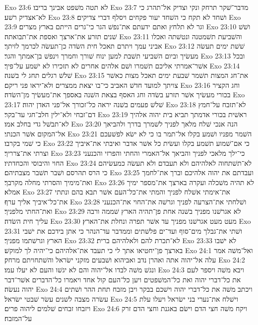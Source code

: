 Exo 23:6  לא תטה משׁפט אבינך בריבו׃
Exo 23:7  מדבר־שׁקר תרחק ונקי וצדיק אל־תהרג כי לא־אצדיק רשׁע׃
Exo 23:8  ושׁחד לא תקח כי השׁחד יעור פקחים ויסלף דברי צדיקים׃
Exo 23:9  וגר לא תלחץ ואתם ידעתם את־נפשׁ הגר כי־גרים הייתם בארץ מצרים׃
Exo 23:10  ושׁשׁ שׁנים תזרע את־ארצך ואספת את־תבואתה׃
Exo 23:11  והשׁביעת תשׁמטנה ונטשׁתה ואכלו אביני עמך ויתרם תאכל חית השׂדה כן־תעשׂה לכרמך לזיתך׃
Exo 23:12  שׁשׁת ימים תעשׂה מעשׂיך וביום השׁביעי תשׁבת למען ינוח שׁורך וחמרך וינפשׁ בן־אמתך והגר׃
Exo 23:13  ובכל אשׁר־אמרתי אליכם תשׁמרו ושׁם אלהים אחרים לא תזכירו לא ישׁמע על־פיך׃
Exo 23:14  שׁלשׁ רגלים תחג לי בשׁנה׃
Exo 23:15  את־חג המצות תשׁמר שׁבעת ימים תאכל מצות כאשׁר צויתך למועד חדשׁ האביב כי־בו יצאת ממצרים ולא־יראו פני ריקם׃
Exo 23:16  וחג הקציר בכורי מעשׂיך אשׁר תזרע בשׂדה וחג האסף בצאת השׁנה באספך את־מעשׂיך מן־השׂדה׃
Exo 23:17  שׁלשׁ פעמים בשׁנה יראה כל־זכורך אל־פני האדן יהוה׃
Exo 23:18  לא־תזבח על־חמץ דם־זבחי ולא־ילין חלב־חגי עד־בקר׃
Exo 23:19  ראשׁית בכורי אדמתך תביא בית יהוה אלהיך לא־תבשׁל גדי בחלב אמו׃
Exo 23:20  הנה אנכי שׁלח מלאך לפניך לשׁמרך בדרך ולהביאך אל־המקום אשׁר הכנתי׃
Exo 23:21  השׁמר מפניו ושׁמע בקלו אל־תמר בו כי לא ישׂא לפשׁעכם כי שׁמי בקרבו׃
Exo 23:22  כי אם־שׁמוע תשׁמע בקלו ועשׂית כל אשׁר אדבר ואיבתי את־איביך וצרתי את־צרריך׃
Exo 23:23  כי־ילך מלאכי לפניך והביאך אל־האמרי והחתי והפרזי והכנעני החוי והיבוסי והכחדתיו׃
Exo 23:24  לא־תשׁתחוה לאלהיהם ולא תעבדם ולא תעשׂה כמעשׂיהם כי הרס תהרסם ושׁבר תשׁבר מצבתיהם׃
Exo 23:25  ועבדתם את יהוה אלהיכם וברך את־לחמך ואת־מימיך והסרתי מחלה מקרבך׃
Exo 23:26  לא תהיה משׁכלה ועקרה בארצך את־מספר ימיך אמלא׃
Exo 23:27  את־אימתי אשׁלח לפניך והמתי את־כל־העם אשׁר תבא בהם ונתתי את־כל־איביך אליך ערף׃
Exo 23:28  ושׁלחתי את־הצרעה לפניך וגרשׁה את־החוי את־הכנעני ואת־החתי מלפניך׃
Exo 23:29  לא אגרשׁנו מפניך בשׁנה אחת פן־תהיה הארץ שׁממה ורבה עליך חית השׂדה׃
Exo 23:30  מעט מעט אגרשׁנו מפניך עד אשׁר תפרה ונחלת את־הארץ׃
Exo 23:31  ושׁתי את־גבלך מים־סוף ועד־ים פלשׁתים וממדבר עד־הנהר כי אתן בידכם את ישׁבי הארץ וגרשׁתמו מפניך׃
Exo 23:32  לא־תכרת להם ולאלהיהם ברית׃
Exo 23:33  לא ישׁבו בארצך פן־יחטיאו אתך לי כי תעבד את־אלהיהם כי־יהיה לך למוקשׁ׃
Exo 24:1  ואל־משׁה אמר עלה אל־יהוה אתה ואהרן נדב ואביהוא ושׁבעים מזקני ישׂראל והשׁתחויתם מרחק׃
Exo 24:2  ונגשׁ משׁה לבדו אל־יהוה והם לא יגשׁו והעם לא יעלו עמו׃
Exo 24:3  ויבא משׁה ויספר לעם את כל־דברי יהוה ואת כל־המשׁפטים ויען כל־העם קול אחד ויאמרו כל־הדברים אשׁר־דבר יהוה נעשׂה׃
Exo 24:4  ויכתב משׁה את כל־דברי יהוה וישׁכם בבקר ויבן מזבח תחת ההר ושׁתים עשׂרה מצבה לשׁנים עשׂר שׁבטי ישׂראל׃
Exo 24:5  וישׁלח את־נערי בני ישׂראל ויעלו עלת ויזבחו זבחים שׁלמים ליהוה פרים׃
Exo 24:6  ויקח משׁה חצי הדם וישׂם באגנת וחצי הדם זרק על־המזבח׃
